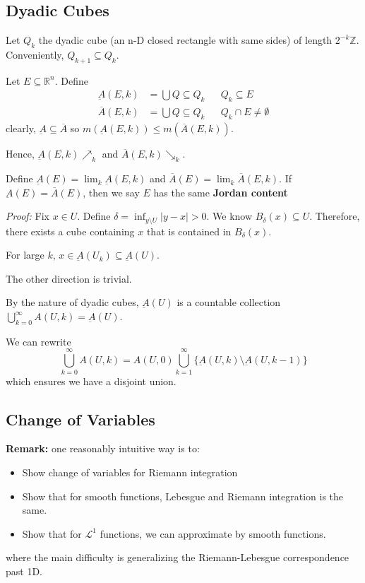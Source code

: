 \documentclass[12pt]{report}
\newcommand{\R}{\mathbb{R}}
\newcommand{\Z}{\mathbb{Z}}
\newcommand{\abs}[1]{\left\vert #1 \right\vert}
\renewcommand{\L}{\mathcal{L}}
\newcommand{\sub}{\subseteq}
\renewcommand{\bar}[1]{\overline{#1}}
\newcommand*{\tbf}[1]{\ifmmode\mathbf{#1}\else\textbf{#1}\fi}
\newenvironment*{tbox}[2][gray]{
    \begin{tcolorbox}[
        parbox=false,
        colback=#1!5!white,
        colframe=#1!75!black,
        breakable,
        title={#2}
    ]}
    {\end{tcolorbox}}
\begin{document}
\subsection*{Dyadic Cubes}
    Let $Q_k$ the dyadic cube (an n-D closed rectangle with same sides) of length $2^{-k} \Z$. Conveniently, $Q_{k+1} \sub Q_k$. 

    Let $E \sub \R^n$. Define 
    \begin{align*}
        \underbar A(E, k) &= \bigcup Q \sub Q_k && Q_k \sub E\\ 
        \bar A(E, k) &= \bigcup Q \sub Q_k && Q_k \cap E \neq \emptyset 
    \end{align*}
    clearly, $\underbar A \sub \bar A$ so $m(\underbar A(E, k)) \leq m(\bar A(E, k))$. 

    Hence, $\underbar A(E, k) \nearrow_k$ and $\bar A(E, k) \searrow_k$.

    Define $\underbar A(E) = \lim_k \underbar A(E, k)$ and $\bar A(E) = \lim_k \bar A(E, k)$. If $\underbar A(E) = \bar A(E)$, then we say $E$ has the same \tbf{Jordan content}

    \begin{tbox}{\textbf{Lemma:} Let $U$ be open, then $U = \underbar A(U)$. Moreover, $U$ is a countable union of disjoint cubes}
        \emph{Proof:} Fix $x \in U$. Define $\delta = \inf_{y \setminus U} \abs{y - x} > 0$. We know $B_{\delta}(x) \sub U$. Therefore, there exists a cube containing $x$ that is contained in $B_{\delta}(x)$.

        For large $k$, $x \in \underbar A(U_k) \sub \underbar A(U)$.

        The other direction is trivial.

        By the nature of dyadic cubes, $\underbar A(U)$ is a countable collection $\bigcup_{k=0}^{\infty} A(U, k) = \underbar A(U)$. 

        We can rewrite 
        \[\bigcup_{k=0}^{\infty} A(U, k)  = A(U, 0) \bigcup_{k=1}^\infty \{\underbar A(U, k) \setminus \underbar A(U, k-1)\}\]
        which ensures we have a disjoint union. 
    \end{tbox}

\subsection*{Change of Variables}
    \tbf{Remark:} one reasonably intuitive way is to:
    \begin{itemize}
        \item Show change of variables for Riemann integration 
        \item Show that for smooth functions, Lebesgue and Riemann integration is the same.
        \item Show that for $\L^1$ functions, we can approximate by smooth functions.
    \end{itemize} 
    where the main difficulty is generalizing the Riemann-Lebesgue correspondence past 1D. 
\end{document}
